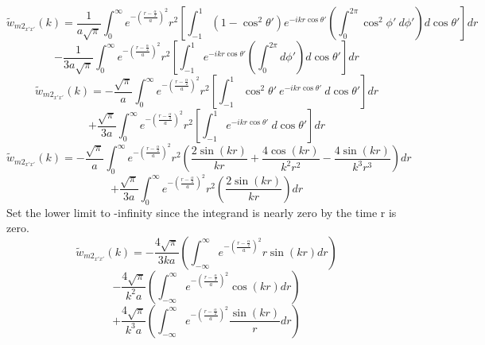\documentclass[letterpaper,twocolumn,amsmath,amssymb,prb]{revtex4-1}
\begin{document}
\begin{widetext}
\begin{displaymath}{\widetilde{w}_{{m2}_{x'x'}}(k)=\frac{1}{a\sqrt{\pi}}\int_{0}^{\infty}e^{-\left(\frac{r-\frac{\alpha}{2}}{a}\right)^2}r^2\left[\int_{-1}^{1}\left(1-\cos^2\theta'\right)e^{-ikr\cos\theta'}\left(\int_{0}^{2\pi}\cos^2\phi'~d{\phi'}\right)d{\cos\theta'}\right]d{r}}\end{displaymath} 
\begin{equation}{-\frac{1}{3a\sqrt{\pi}}\int_{0}^{\infty}e^{-\left(\frac{r-\frac{\alpha}{2}}{a}\right)^2}r^2\left[\int_{-1}^{1}e^{-ikr\cos\theta'}\left(\int_{0}^{2\pi}d{\phi'}\right)d{\cos\theta'}\right]d{r}}\end{equation}
\[{}\]
\color{blue}
\begin{displaymath}{\widetilde{w}_{{m2}_{x'x'}}(k)=-\frac{\sqrt{\pi}}{a}\int_{0}^{\infty}e^{-\left(\frac{r-\frac{\alpha}{2}}{a}\right)^2}r^2\left[\int_{-1}^{1}\cos^2\theta'~e^{-ikr\cos\theta'}~d{\cos\theta'}\right]d{r}}\end{displaymath} 
\begin{equation}\label{compare_equation}{+\frac{\sqrt{\pi}}{3a}\int_{0}^{\infty}e^{-\left(\frac{r-\frac{\alpha}{2}}{a}\right)^2}r^2\left[\int_{-1}^{1}e^{-ikr\cos\theta'}~d{\cos\theta'}\right]d{r}}\end{equation}
\color{black}
\[{}\]
\begin{displaymath}{\widetilde{w}_{{m2}_{x'x'}}(k)=-\frac{\sqrt{\pi}}{a}\int_{0}^{\infty}e^{-\left(\frac{r-\frac{\alpha}{2}}{a}\right)^2}r^2\left(\frac{2\sin(kr)}{kr}+\frac{4\cos(kr)}{k^2r^2}-\frac{4\sin(kr)}{k^3r^3}\right)d{r}}\end{displaymath} 
\begin{equation}{+\frac{\sqrt{\pi}}{3a}\int_{0}^{\infty}e^{-\left(\frac{r-\frac{\alpha}{2}}{a}\right)^2}r^2\left(\frac{2\sin(kr)}{kr}\right)d{r}}\end{equation}
Set the lower limit to -infinity since the integrand is nearly zero by the time r is zero. 
\begin{displaymath}{\widetilde{w}_{{m2}_{x'x'}}(k)=-\frac{4\sqrt{\pi}}{3ka}\left(\int_{-\infty}^{\infty}e^{-\left(\frac{r-\frac{\alpha}{2}}{a}\right)^2}r\sin(kr)d{r}\right)}\end{displaymath} 
\begin{displaymath}{-\frac{4\sqrt{\pi}}{k^2a}\left(\int_{-\infty}^{\infty}e^{-\left(\frac{r-\frac{\alpha}{2}}{a}\right)^2}\cos(kr)d{r}\right)}\end{displaymath} 
\begin{equation}{+\frac{4\sqrt{\pi}}{k^3a}\left(\int_{-\infty}^{\infty}e^{-\left(\frac{r-\frac{\alpha}{2}}{a}\right)^2}\frac{\sin(kr)}{r}d{r}\right)}\end{equation} 

\end{widetext}
\end{document}
